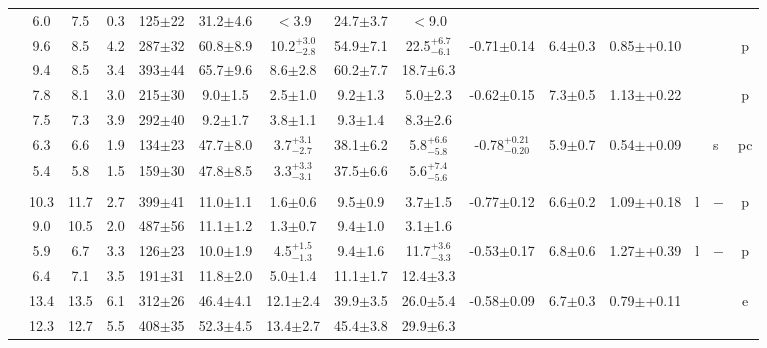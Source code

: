 \documentclass[iop,revtex4]{emulateapj}
\newcommand\M{\rule{0pt}{2.3ex}}
\newcommand\U{\rule{0pt}{3.2ex}}       %
\begin{document}
\begin{landscape}
{\begin{longtable}{ccccccccccccp{0.25in}p{0.25in}c}
\M&6.0&7.5&0.3&125$\pm$22&31.2$\pm$4.6&$<$3.9&24.7$\pm$3.7&$<$9.0&&&&&&\\
\U\multirow{2}{*}{16}&9.6&8.5&4.2&287$\pm$32&60.8$\pm$8.9&10.2$^{+3.0}_{-2.8}$&54.9$\pm$7.1&22.5$^{+6.7}_{-6.1}$&\multirow{2}{*}{-0.71$\pm$0.14}&\multirow{2}{*}{6.4$\pm$0.3}&\multirow{2}{*}{0.85$\pm$+0.10}&\multirow{2}{*}{}&\multirow{2}{*}{}&\multirow{2}{*}{p}\\
\M&9.4&8.5&3.4&393$\pm$44&65.7$\pm$9.6&8.6$\pm$2.8&60.2$\pm$7.7&18.7$\pm$6.3&&&&&&\\
\U\multirow{2}{*}{17}&7.8&8.1&3.0&215$\pm$30&9.0$\pm$1.5&2.5$\pm$1.0&9.2$\pm$1.3&5.0$\pm$2.3&\multirow{2}{*}{-0.62$\pm$0.15}&\multirow{2}{*}{7.3$\pm$0.5}&\multirow{2}{*}{1.13$\pm$+0.22}&\multirow{2}{*}{}&\multirow{2}{*}{}&\multirow{2}{*}{p}\\
\M&7.5&7.3&3.9&292$\pm$40&9.2$\pm$1.7&3.8$\pm$1.1&9.3$\pm$1.4&8.3$\pm$2.6&&&&&&\\
\U\multirow{2}{*}{18}&6.3&6.6&1.9&134$\pm$23&47.7$\pm$8.0&3.7$^{+3.1}_{-2.7}$&38.1$\pm$6.2&5.8$^{+6.6}_{-5.8}$&\multirow{2}{*}{-0.78$^{+0.21}_{-0.20}$}&\multirow{2}{*}{5.9$\pm$0.7}&\multirow{2}{*}{0.54$\pm$+0.09}&\multirow{2}{*}{}&\multirow{2}{*}{s}&\multirow{2}{*}{pc}\\
\M&5.4&5.8&1.5&159$\pm$30&47.8$\pm$8.5&3.3$^{+3.3}_{-3.1}$&37.5$\pm$6.6&5.6$^{+7.4}_{-5.6}$&&&&&&\\
&&&&&&&&&&&&&&\\
\U\multirow{2}{*}{19}&10.3&11.7&2.7&399$\pm$41&11.0$\pm$1.1&1.6$\pm$0.6&9.5$\pm$0.9&3.7$\pm$1.5&\multirow{2}{*}{-0.77$\pm$0.12}&\multirow{2}{*}{6.6$\pm$0.2}&\multirow{2}{*}{1.09$\pm$+0.18}&\multirow{2}{*}{l}&\multirow{2}{*}{$-$}&\multirow{2}{*}{p}\\
\M&9.0&10.5&2.0&487$\pm$56&11.1$\pm$1.2&1.3$\pm$0.7&9.4$\pm$1.0&3.1$\pm$1.6&&&&&&\\
\U\multirow{2}{*}{20}&5.9&6.7&3.3&126$\pm$23&10.0$\pm$1.9&4.5$^{+1.5}_{-1.3}$&9.4$\pm$1.6&11.7$^{+3.6}_{-3.3}$&\multirow{2}{*}{-0.53$\pm$0.17}&\multirow{2}{*}{6.8$\pm$0.6}&\multirow{2}{*}{1.27$\pm$+0.39}&\multirow{2}{*}{l}&\multirow{2}{*}{$-$}&\multirow{2}{*}{p}\\
\M&6.4&7.1&3.5&191$\pm$31&11.8$\pm$2.0&5.0$\pm$1.4&11.1$\pm$1.7&12.4$\pm$3.3&&&&&&\\
\U\multirow{2}{*}{21}&13.4&13.5&6.1&312$\pm$26&46.4$\pm$4.1&12.1$\pm$2.4&39.9$\pm$3.5&26.0$\pm$5.4&\multirow{2}{*}{-0.58$\pm$0.09}&\multirow{2}{*}{6.7$\pm$0.3}&\multirow{2}{*}{0.79$\pm$+0.11}&\multirow{2}{*}{}&\multirow{2}{*}{}&\multirow{2}{*}{e}\\
\M&12.3&12.7&5.5&408$\pm$35&52.3$\pm$4.5&13.4$\pm$2.7&45.4$\pm$3.8&29.9$\pm$6.3&&&&&&\\


\end{longtable}}
\end{landscape}
\end{document}
